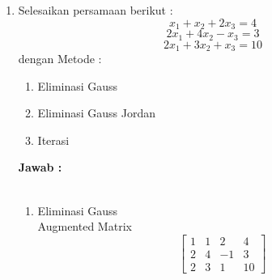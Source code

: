 \documentclass{uofa-eng-assignment}
\begin{document}
\maketitle

\begin{enumerate}

    \item Selesaikan persamaan berikut : \\
          \begin{equation}
              x_1 + x_2 + 2x_3 = 4
          \end{equation}
          \begin{equation}
              2x_1 + 4x_2 - x_3 = 3
          \end{equation}
          \begin{equation}
              2x_1 + 3x_2 + x_3 = 10
          \end{equation}
          dengan Metode : \\
          \begin{enumerate}
              \item Eliminasi Gauss
              \item Eliminasi Gauss Jordan
              \item Iterasi
          \end{enumerate}
          \textbf{Jawab :}\\\\

          \begin{enumerate}
              \item Eliminasi Gauss \\
                    Augmented Matrix \\
                    \begin{equation}
                        \begin{bmatrix}
                            1 & 1 & 2  & 4  \\
                            2 & 4 & -1 & 3  \\
                            2 & 3 & 1  & 10
                        \end{bmatrix}
                    \end{equation}


\end{enumerate}
\end{enumerate}
\end{document}
